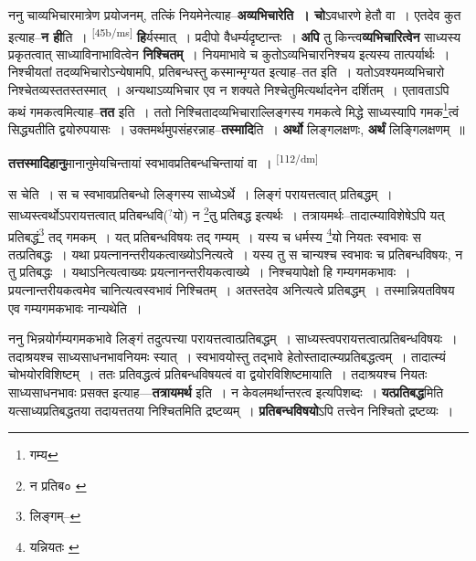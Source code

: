 \documentclass[article,12pt,a4paper]{memoir}
\newcommand{\unclear}[1]{($^{?}$#1)}
\begin{document}
	  \pstart ननु चाव्यभिचारमात्रेण प्रयोजनम्, तत्किं नियमेनेत्याह--\textbf{अव्यभिचारेति । चो}ऽवधारणे हेतौ वा । एतदेव कुत इत्याह--\textbf{न ही}ति । \leavevmode\textsuperscript{\rmlatinfont\tiny [45b/ms]} \textbf{हि}र्यस्मात् । प्रदीपो वैधर्म्यदृष्टान्तः । \textbf{अपि} तु किन्त्व\textbf{व्यभिचारित्वेन} साध्यस्य प्रकृतत्वात् साध्याविनाभावित्वेन \textbf{निश्चितम्} । नियमाभावे च कुतोऽव्यभिचारनिश्चय इत्यस्य तात्पर्यार्थः । निश्चीयतां तदव्यभिचारोऽन्येषामपि, प्रतिबन्धस्तु कस्मान्मृग्यत इत्याह--तत इति । यतोऽवश्यमव्यभिचारो निश्चेतव्यस्ततस्तस्मात् । अन्यथाऽव्यभिचार एव न शक्यते निश्चेतुमित्यर्थादनेन दर्शितम् । एतावताऽपि कथं गमकत्वमित्याह--\textbf{तत} इति । ततो निश्चितादव्यभिचाराल्लिङ्गस्य गमकत्वे मिद्धे साध्यस्यापि गमक\footnote{गम्य}त्वं सिद्ध्यतीति द्वयोरुपयासः । उक्तमर्थमुपसंहरन्नाह--\textbf{तस्मादि}ति । \textbf{अर्थो} लिङ्गलक्षणः, \textbf{अर्थं} लिङ्गिलक्षणम् ॥
	\pend
      

	  \pstart \textbf{तत्तस्मादिहानु}मानानुमेयचिन्तायां स्वभावप्रतिबन्धचिन्तायां वा ।
	\pend
      \leavevmode\textsuperscript{\rmlatinfont\tiny [112/dm]}

	  \pstart स चेति । स च स्वभावप्रतिबन्धो लिङ्गस्य साध्येऽर्थे । लिङ्गं परायत्तत्वात् प्रतिबद्धम् । साध्यस्त्वर्थोऽपरायत्तत्वात् प्रतिबन्धवि\unclear{यो} न \footnote{न प्रतिब० \cite{dp-msA} \cite{dp-msB} \cite{dp-msD} \cite{dp-edP} \cite{dp-edH} \cite{dp-edE} \cite{dp-edN}}तु प्रतिबद्ध इत्यर्थः । तत्रायमर्थः--तादात्म्याविशेषेऽपि यत् प्रतिबद्धं\footnote{लिङ्गम्--\cite{dp-msD-n}} तद् गमकम् । यत् प्रतिबन्धविषयः तद् गम्यम् । यस्य च धर्मस्य \footnote{यन्नियतः \cite{dp-msA} \cite{dp-msB} \cite{dp-msC} \cite{dp-msD} \cite{dp-edP} \cite{dp-edH} \cite{dp-edE} \cite{dp-edN}}यो नियतः स्वभावः स तत्प्रतिबद्धः । यथा प्रयत्नानन्तरीयकत्वाख्योऽनित्यत्वे । यस्य तु स चान्यश्च स्वभावः च प्रतिबन्धविषयः, न तु प्रतिबद्धः । यथाऽनित्यत्वाख्यः प्रयत्नानन्तरीयकत्वाख्ये । निश्चयापेक्षो हि गम्यगमकभावः । प्रयत्नान्तरीयकत्वमेव चानित्यत्वस्वभावं निश्चितम् । अतस्तदेव अनित्यत्वे प्रतिबद्धम् । तस्मान्नियतविषय एव गम्यगमकभावः नान्यथेति ।
	\pend
      

	  \pstart ननु भिन्नयोर्गम्यगमकभावे लिङ्गं तदुत्पत्त्या परायत्तत्वात्प्रतिबद्धम् । साध्यस्त्वपरायत्तत्वात्प्रतिबन्धविषयः । तदाश्रयश्च साध्यसाधनभावनियमः स्यात् । स्वभावयोस्तु तद्भावे हेतोस्तादात्म्यप्रतिबद्धत्वम् । तादात्म्यं चोभयोरविशिष्टम् । ततः प्रतिवद्धत्वं प्रतिबन्धविषयत्वं वा द्वयोरविशिष्टमायाति । तदाश्रयश्च नियतः साध्यसाधनभावः प्रसक्त इत्याह—\textbf{तत्रायमर्थ} इति । न केवलमर्थान्तरत्व इत्यपिशब्दः । \textbf{यत्प्रतिबद्ध}मिति यत्साध्यप्रतिबद्धतया तदायत्ततया निश्चितमिति द्रष्टव्यम् । \textbf{प्रतिबन्धविषयो}ऽपि तत्त्वेन निश्चितो द्रष्टव्यः ।
	\pend
      
\end{document}
